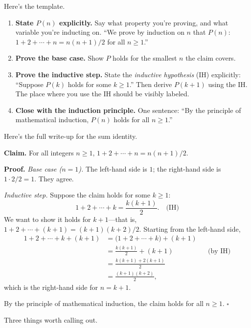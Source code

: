 \documentclass[11pt]{article}
\begin{document}
Here's the template.

\begin{enumerate}
  \item \textbf{State $P(n)$ explicitly.} Say what property you're proving, and what variable you're inducting on. ``We prove by induction on $n$ that $P(n)$: $1 + 2 + \cdots + n = n(n+1)/2$ for all $n \geq 1$.''
  \item \textbf{Prove the base case.} Show $P$ holds for the smallest $n$ the claim covers.
  \item \textbf{Prove the inductive step.} State the \emph{inductive hypothesis} (IH) explicitly: ``Suppose $P(k)$ holds for some $k \geq 1$.'' Then derive $P(k+1)$ using the IH. The place where you use the IH should be visibly labeled.
  \item \textbf{Close with the induction principle.} One sentence: ``By the principle of mathematical induction, $P(n)$ holds for all $n \geq 1$.''
\end{enumerate}

Here's the full write-up for the sum identity.

\medskip
\noindent\textbf{Claim.} For all integers $n \geq 1$, $1 + 2 + \cdots + n = n(n+1)/2$.

\medskip
\noindent\textbf{Proof.} \emph{Base case ($n = 1$).} The left-hand side is $1$; the right-hand side is $1 \cdot 2 / 2 = 1$. They agree.

\smallskip
\emph{Inductive step.} Suppose the claim holds for some $k \geq 1$:
\[
  1 + 2 + \cdots + k = \frac{k(k+1)}{2}. \quad \text{(IH)}
\]
We want to show it holds for $k + 1$---that is, $1 + 2 + \cdots + (k+1) = (k+1)(k+2)/2$. Starting from the left-hand side,
\begin{align*}
  1 + 2 + \cdots + k + (k+1) &= \bigl(1 + 2 + \cdots + k\bigr) + (k+1) \\
  &= \frac{k(k+1)}{2} + (k+1) && \text{(by IH)} \\
  &= \frac{k(k+1) + 2(k+1)}{2} \\
  &= \frac{(k+1)(k+2)}{2},
\end{align*}
which is the right-hand side for $n = k+1$.

\smallskip
By the principle of mathematical induction, the claim holds for all $n \geq 1$. $\square$

\medskip

Three things worth calling out.
\end{document}
